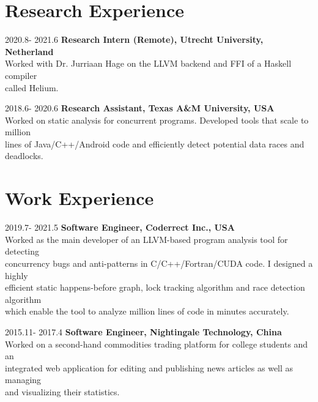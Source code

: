 \documentclass[12pt,letterpaper]{report}
\begin{document}

\section*{Research Experience}

\begin{tablist}[style=multiline, leftmargin=*]
	\item[2020.8- 2021.6]
	\tab \textbf{Research Intern (Remote), Utrecht University, Netherland}\\
	\tab Worked with Dr. Jurriaan Hage on the LLVM backend and FFI of a Haskell compiler \\
	\tab called Helium.
	\item[2018.6- 2020.6]
	\tab \textbf{Research Assistant, Texas A\&M University, USA}\\
	\tab Worked on static analysis for concurrent programs. Developed tools that scale to million\\
	\tab lines of Java/C++/Android code and efficiently detect potential data races and deadlocks.
\end{tablist}


\section*{Work Experience}

\begin{tablist}[style=multiline, leftmargin=*]
	\item[2019.7- 2021.5]
	\tab \textbf{Software Engineer, Coderrect Inc., USA}\\
	\tab Worked as the main developer of an LLVM-based program analysis tool for detecting\\
	\tab concurrency bugs and anti-patterns in C/C++/Fortran/CUDA code. I designed a highly\\
	\tab efficient static happens-before graph, lock tracking algorithm and race detection algorithm\\
	\tab which enable the tool to analyze million lines of code in minutes accurately.
	\item[2015.11- 2017.4]
	\tab \textbf{Software Engineer, Nightingale Technology, China}\\
	\tab Worked on a second-hand commodities trading platform for college students and an\\
	\tab integrated web application for editing and publishing news articles as well as managing\\
	\tab and visualizing their statistics.
\end{tablist}
\end{document}
